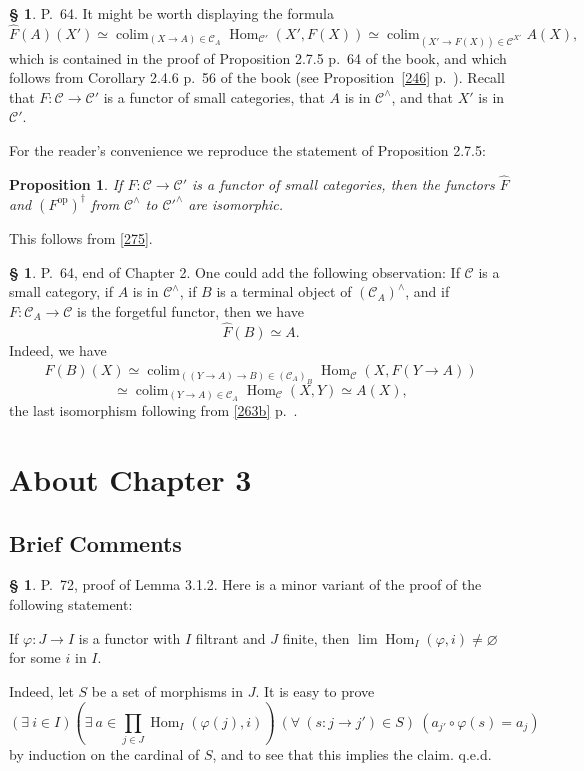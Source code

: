 \documentclass[12pt]{article}
\newtheorem{prop}[thm]{Proposition}
\theoremstyle{remark}
\theoremstyle{definition}
\newtheorem{s}[thm]{\S}
\newcommand{\C}{\mathcal C}
\newcommand{\pp}{\varphi}
\DeclareMathOperator*{\colim}{colim}
\DeclareMathOperator{\Hom}{Hom}
\DeclareMathOperator{\op}{op}
\begin{document}

\begin{s} 
P.~64. It might be worth displaying the formula 
%
\begin{equation}\label{275}
\widehat F(A)(X')\simeq\colim_{(X\to A)\in\C_A}\Hom_{\C'}(X',F(X))\simeq
\colim_{(X'\to F(X))\in\C^{X'}}A(X),
\end{equation} 
%
which is contained in the proof of Proposition 2.7.5 p.~64 of the book, and which follows from Corollary 2.4.6 p.~56 of the book (see Proposition~\ref{246} p.~\pageref{246}). Recall that $F:\C\to\C'$ is a functor of small categories, that $A$ is in $\C^\wedge$, and that $X'$ is in $\C'$. 

For the reader's convenience we reproduce the statement of Proposition 2.7.5: 

\begin{prop}
If $F:\C\to\C'$ is a functor of small categories, then the functors $\widehat F$ and $(F^{\op})^\dagger$ from $\C^\wedge$ to $\C'^\wedge$ are isomorphic. 
\end{prop} 

This follows from \eqref{275}.
\end{s}

%

\begin{s}
P.~64, end of Chapter 2. One could add the following observation: If $\C$ is a small category, if $A$ is in $\C^\wedge$, if $B$ is a terminal object of $(\C_A)^\wedge$, and if $F:\C_A\to\C$ is the forgetful functor, then we have 
$$
\widehat F(B)\simeq A.
$$ 
Indeed, we have 
$$
\widehat F(B)(X)\simeq\colim_{((Y\to A)\to B)\in(\C_A)_B}\Hom_\C(X,F(Y\to A))
$$
$$
\simeq\colim_{(Y\to A)\in\C_A}\Hom_\C(X,Y)\simeq A(X),
$$ 
the last isomorphism following from \eqref{263b} p.~\pageref{263b}. 
\end{s}


\section{About Chapter 3}

\subsection{Brief Comments}

\begin{s} 
P.~72, proof of Lemma 3.1.2. Here is a minor variant of the proof of the following statement: 

If $\pp:J\to I$ is a functor with $I$ filtrant and $J$ finite, then $\lim\Hom_I(\pp,i)\neq\varnothing$ for some $i$ in $I$. 

Indeed, let $S$ be a set of morphisms in $J$. It is easy to prove 
$$
(\exists\ i\in I)\left(\exists\ a\in\prod_{j\in J}\Hom_I(\pp(j),i)\right)\ (\forall\ (s:j\to j')\in S)\ (a_{j'}\circ\pp(s)=a_j) 
$$ 
by induction on the cardinal of $S$, and to see that this implies the claim. q.e.d.
\end{s}
\end{document}
